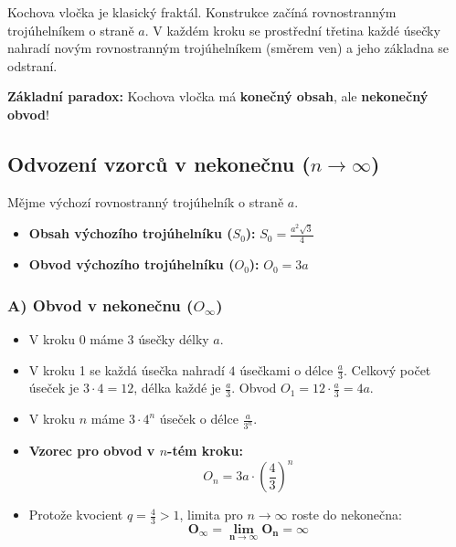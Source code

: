 \documentclass[12pt,a4paper]{article}
\begin{document}
Kochova vločka je klasický fraktál. Konstrukce začíná rovnostranným trojúhelníkem o straně $a$. V každém kroku se prostřední třetina každé úsečky nahradí novým rovnostranným trojúhelníkem (směrem ven) a jeho základna se odstraní.

\begin{tcolorbox}[colback=blue!5!white,colframe=blue!75!black,title=Poznámka]
\textbf{Základní paradox:} Kochova vločka má \textbf{konečný obsah}, ale \textbf{nekonečný obvod}!
\end{tcolorbox}

\subsection{Odvození vzorců v nekonečnu ($n \to \infty$)}

Mějme výchozí rovnostranný trojúhelník o straně $a$.
\begin{itemize}
    \item \textbf{Obsah výchozího trojúhelníku ($S_0$):} $S_0 = \frac{a^2\sqrt{3}}{4}$
    \item \textbf{Obvod výchozího trojúhelníku ($O_0$):} $O_0 = 3a$
\end{itemize}

\subsubsection*{A) Obvod v nekonečnu ($O_\infty$)}
\begin{itemize}
    \item V kroku 0 máme $3$ úsečky délky $a$.
    \item V kroku 1 se každá úsečka nahradí $4$ úsečkami o délce $\frac{a}{3}$. Celkový počet úseček je $3 \cdot 4 = 12$, délka každé je $\frac{a}{3}$. Obvod $O_1 = 12 \cdot \frac{a}{3} = 4a$.
    \item V kroku $n$ máme $3 \cdot 4^n$ úseček o délce $\frac{a}{3^n}$.
    \item \textbf{Vzorec pro obvod v $n$-tém kroku:}
    \[ O_n = 3a \cdot \left(\frac{4}{3}\right)^n \]
    \item Protože kvocient $q = \frac{4}{3} > 1$, limita pro $n \to \infty$ roste do nekonečna:
    \[ \mathbf{O_\infty = \lim_{n\to\infty} O_n = \infty} \]
\end{itemize}
\end{document}
